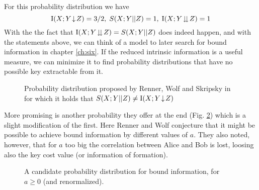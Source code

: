      For this probability distribution we have
	$$ \operatorname{I}(X;Y\!\downarrow\!Z) = 3/2 ,\; S(X;Y||Z) = 1 , \; \operatorname{I}(X;Y\!\downdownarrows\!Z) = 1 $$
	With the the fact that $\operatorname{I}(X;Y\!\downdownarrows\!Z) = S(X;Y||Z)$ does indeed happen, and with the statements above, we can think of a model to later search for bound information in chapter \ref{ch:six}. 
	If the reduced intrinsic information is a useful measure, we can minimize it to find probability distributions that have no possible key extractable from it.
     
	\begin{figure}
		
	    \caption{Probability distribution proposed by Renner, Wolf and Skripsky in \cite{RW03} for which it holds that $S(X;Y||Z) \neq \operatorname{I}(X;Y\!\downarrow\!Z)$}
	    \label{Tab:candidate}
	\end{figure}	 
	
	More promising is another probability they offer at the end (Fig. \ref{Tab:candidate2}) which is a slight modification of the first. 
	Here Renner and Wolf conjecture that it might be possible to achieve bound information by different values of $a$. 
	They also noted, however, that for $a$ too big the correlation between Alice and Bob is lost, loosing also the key cost value (or information of formation).
	
	
	\begin{figure}
		
	    	
	    	\caption{A candidate probability distribution for bound information, for $a\geq 0$ (and renormalized).}
	    	\label{Tab:candidate2}
	\end{figure}
    
